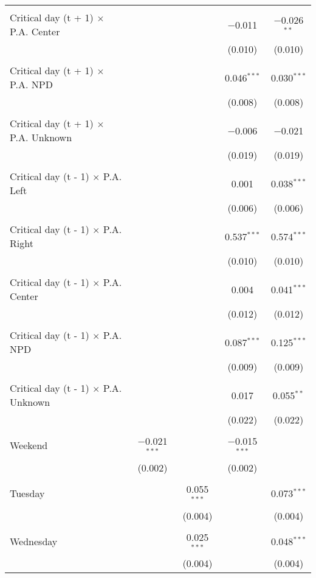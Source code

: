\documentclass[
]{article}
\begin{document}
\begin{table}[!htbp]
{\begin{tabular}{@{\extracolsep{5pt}}lcccc}
  & & & & \\ 
 Critical day (t + 1) $\times$ P.A. Center &  &  & $-$0.011 & $-$0.026$^{**}$ \\ 
  &  &  & (0.010) & (0.010) \\ 
  & & & & \\ 
 Critical day (t + 1) $\times$ P.A. NPD &  &  & 0.046$^{***}$ & 0.030$^{***}$ \\ 
  &  &  & (0.008) & (0.008) \\ 
  & & & & \\ 
 Critical day (t + 1) $\times$ P.A. Unknown &  &  & $-$0.006 & $-$0.021 \\ 
  &  &  & (0.019) & (0.019) \\ 
  & & & & \\ 
 Critical day (t - 1) $\times$ P.A. Left &  &  & 0.001 & 0.038$^{***}$ \\ 
  &  &  & (0.006) & (0.006) \\ 
  & & & & \\ 
 Critical day (t - 1) $\times$ P.A. Right &  &  & 0.537$^{***}$ & 0.574$^{***}$ \\ 
  &  &  & (0.010) & (0.010) \\ 
  & & & & \\ 
 Critical day (t - 1) $\times$ P.A. Center &  &  & 0.004 & 0.041$^{***}$ \\ 
  &  &  & (0.012) & (0.012) \\ 
  & & & & \\ 
 Critical day (t - 1) $\times$ P.A. NPD &  &  & 0.087$^{***}$ & 0.125$^{***}$ \\ 
  &  &  & (0.009) & (0.009) \\ 
  & & & & \\ 
 Critical day (t - 1) $\times$ P.A. Unknown &  &  & 0.017 & 0.055$^{**}$ \\ 
  &  &  & (0.022) & (0.022) \\ 
  & & & & \\ 
 Weekend & $-$0.021$^{***}$ &  & $-$0.015$^{***}$ &  \\ 
  & (0.002) &  & (0.002) &  \\ 
  & & & & \\ 
 Tuesday &  & 0.055$^{***}$ &  & 0.073$^{***}$ \\ 
  &  & (0.004) &  & (0.004) \\ 
  & & & & \\ 
 Wednesday &  & 0.025$^{***}$ &  & 0.048$^{***}$ \\ 
  &  & (0.004) &  & (0.004) \\ 

\end{tabular}}
\end{table}
\end{document}

